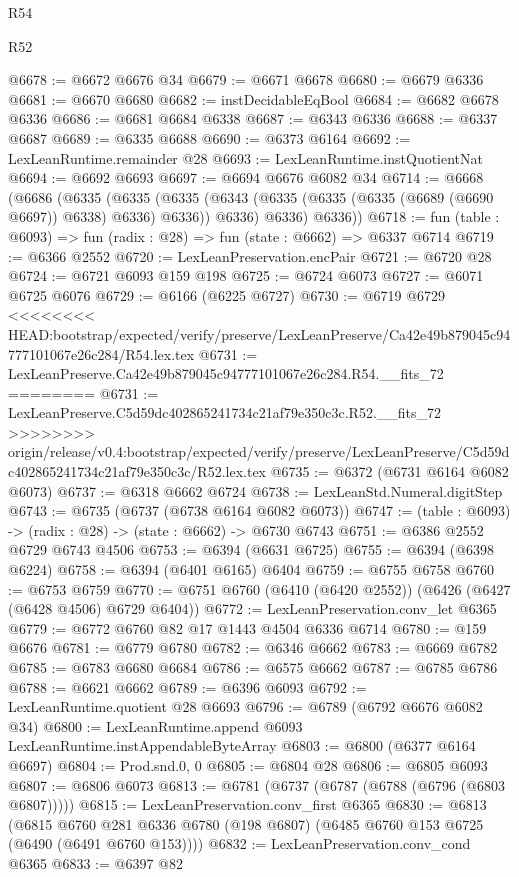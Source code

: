 \begin{lexlean}{R54}
\begin{lexlean}{R52}
\begin{coremodule}
{{{{{{{{{{{{{{{{{{{{{{{{{{{{{{{{{{{{{{{{{{{{{{{{{{{{{{{{{{{{{{{{{{{{{{{{{{{{{{{{{{{{{{{{{{{{{{{{{{{{{{{{{{{{{{{{{{{{{{{{{{{{{{{{{{{{{{{{{{{{{{{{{{{{{{{{{{{{{{{{{{{{{{{{{{{{{{{{{{{{{{{{{{{{{{{{{{{{{{@6678 := @6672 @6676 @34
@6679 := @6671 @6678
@6680 := @6679 @6336
@6681 := @6670 @6680
@6682 := instDecidableEqBool
@6684 := @6682 @6678 @6336
@6686 := @6681 @6684 @6338
@6687 := @6343 @6336
@6688 := @6337 @6687
@6689 := @6335 @6688
@6690 := @6373 @6164
@6692 := LexLeanRuntime.remainder @28
@6693 := LexLeanRuntime.instQuotientNat
@6694 := @6692 @6693
@6697 := @6694 @6676 @6082 @34
@6714 := @6668
    (@6686
      (@6335
        (@6335
          (@6335 (@6343 (@6335 (@6335 (@6335 (@6689 (@6690 @6697)) @6338) @6336) @6336)) @6336)
          @6336)
        @6336))
@6718 := fun (table : @6093) => fun (radix : @28) => fun (state : @6662) => @6337 @6714
@6719 := @6366 @2552
@6720 := LexLeanPreservation.encPair
@6721 := @6720 @28
@6724 := @6721 @6093 @159 @198
@6725 := @6724 @6073
@6727 := @6071 @6725 @6076
@6729 := @6166 (@6225 @6727)
@6730 := @6719 @6729
<<<<<<<< HEAD:bootstrap/expected/verify/preserve/LexLeanPreserve/Ca42e49b879045c94777101067e26c284/R54.lex.tex
@6731 := LexLeanPreserve.Ca42e49b879045c94777101067e26c284.R54.__fits_72
========
@6731 := LexLeanPreserve.C5d59dc402865241734c21af79e350c3c.R52.__fits_72
>>>>>>>> origin/release/v0.4:bootstrap/expected/verify/preserve/LexLeanPreserve/C5d59dc402865241734c21af79e350c3c/R52.lex.tex
@6735 := @6372 (@6731 @6164 @6082 @6073)
@6737 := @6318 @6662 @6724
@6738 := LexLeanStd.Numeral.digitStep
@6743 := @6735 (@6737 (@6738 @6164 @6082 @6073))
@6747 := (table : @6093) -> (radix : @28) -> (state : @6662) -> @6730 @6743
@6751 := @6386 @2552 @6729 @6743 @4506
@6753 := @6394 (@6631 @6725)
@6755 := @6394 (@6398 @6224)
@6758 := @6394 (@6401 @6165) @6404
@6759 := @6755 @6758
@6760 := @6753 @6759
@6770 := @6751 @6760 (@6410 (@6420 @2552)) (@6426 (@6427 (@6428 @4506) @6729 @6404))
@6772 := LexLeanPreservation.conv_let @6365
@6779 := @6772 @6760 @82 @17 @1443 @4504 @6336 @6714
@6780 := @159 @6676
@6781 := @6779 @6780
@6782 := @6346 @6662
@6783 := @6669 @6782
@6785 := @6783 @6680 @6684
@6786 := @6575 @6662
@6787 := @6785 @6786
@6788 := @6621 @6662
@6789 := @6396 @6093
@6792 := LexLeanRuntime.quotient @28 @6693
@6796 := @6789 (@6792 @6676 @6082 @34)
@6800 := LexLeanRuntime.append @6093 LexLeanRuntime.instAppendableByteArray
@6803 := @6800 (@6377 @6164 @6697)
@6804 := Prod.snd.{0, 0}
@6805 := @6804 @28
@6806 := @6805 @6093
@6807 := @6806 @6073
@6813 := @6781 (@6737 (@6787 (@6788 (@6796 (@6803 @6807)))))
@6815 := LexLeanPreservation.conv_first @6365
@6830 := @6813
    (@6815 @6760 @281 @6336 @6780 (@198 @6807) (@6485 @6760 @153 @6725 (@6490 (@6491 @6760 @153))))
@6832 := LexLeanPreservation.conv_cond @6365
@6833 := @6397 @82
}}}}}}}}}}}}}}}}}}}}}}}}}}}}}}}}}}}}}}}}}}}}}}}}}}}}}}}}}}}}}}}}}}}}}}}}}}}}}}}}}}}}}}}}}}}}}}}}}}}}}}}}}}}}}}}}}}}}}}}}}}}}}}}}}}}}}}}}}}}}}}}}}}}}}}}}}}}}}}}}}}}}}}}}}}}}}}}}}}}}}}}}}}}}}}}}}}}}}}
\end{coremodule}
\end{lexlean}
\end{lexlean}
